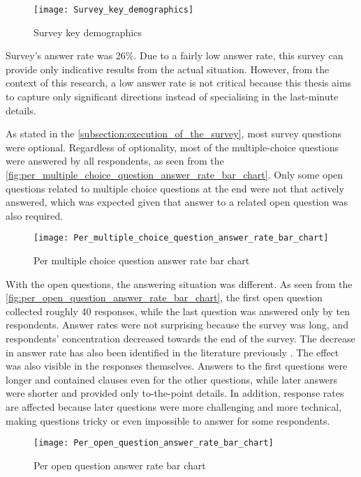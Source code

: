 \begin{figure}
	\centering
	\texttt{[image: Survey\_key\_demographics]}
	\caption{Survey key demographics}
	\label{fig:survey_key_demographics}
\end{figure}

Survey's answer rate was 26\%. Due to a fairly low answer rate, this survey can provide only indicative results from the actual situation. However, from the context of this research, a low answer rate is not critical because this thesis aims to capture only significant directions instead of specialising in the last-minute details.

As stated in the \autoref{subsection:execution_of_the_survey}, most survey questions were optional. Regardless of optionality, most of the multiple-choice questions were answered by all respondents, as seen from the \autoref{fig:per_multiple_choice_question_answer_rate_bar_chart}. Only some open questions related to multiple choice questions at the end were not that actively answered, which was expected given that answer to a related open question was also required.

\begin{figure}
	\centering
	\texttt{[image: Per\_multiple\_choice\_question\_answer\_rate\_bar\_chart]}
	\caption{Per multiple choice question answer rate bar chart}
	\label{fig:per_multiple_choice_question_answer_rate_bar_chart}
\end{figure}

With the open questions, the answering situation was different. As seen from the \autoref{fig:per_open_question_answer_rate_bar_chart}, the first open question collected roughly 40 responses, while the last question was answered only by ten respondents. Answer rates were not surprising because the survey was long, and respondents' concentration decreased towards the end of the survey. The decrease in answer rate has also been identified in the literature previously \cite{burchell1992effect}. The effect was also visible in the responses themselves. Answers to the first questions were longer and contained clauses even for the other questions, while later answers were shorter and provided only to-the-point details. In addition, response rates are affected because later questions were more challenging and more technical, making questions tricky or even impossible to answer for some respondents.

\begin{figure}
	\centering
	\texttt{[image: Per\_open\_question\_answer\_rate\_bar\_chart]}
	\caption{Per open question answer rate bar chart}
	\label{fig:per_open_question_answer_rate_bar_chart}
\end{figure}

